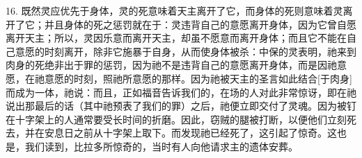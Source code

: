16. 既然灵应优先于身体，灵的死意味着天主离开了它，而身体的死则意味着灵离开了它；并且身体的死之惩罚就在于：灵违背自己的意愿离开身体，因为它曾自愿离开天主；所以，灵因乐意而离开天主，却虽不愿意而离开身体；而且它不能在自己意愿的时刻离开，除非它施暴于自身，从而使身体被杀：中保的灵表明，祂来到肉身的死绝非出于罪的惩罚，因为祂不是违背自己的意愿离开身体，而是因祂意愿，在祂意愿的时刻，照祂所意愿的那样。因为祂被天主的圣言如此结合[于肉身]而成为一体，祂说：而且，正如福音告诉我们的，在场的人对此非常惊讶，即在祂说出那最后的话（其中祂预表了我们的罪）之后，祂便立即交付了灵魂。因为被钉在十字架上的人通常要受长时间的折磨。因此，窃贼的腿被打断，以便他们立刻死去，并在安息日之前从十字架上取下。而发现祂已经死了，这引起了惊奇。这也是，我们读到，比拉多所惊奇的，当时有人向他请求主的遗体安葬。\par

